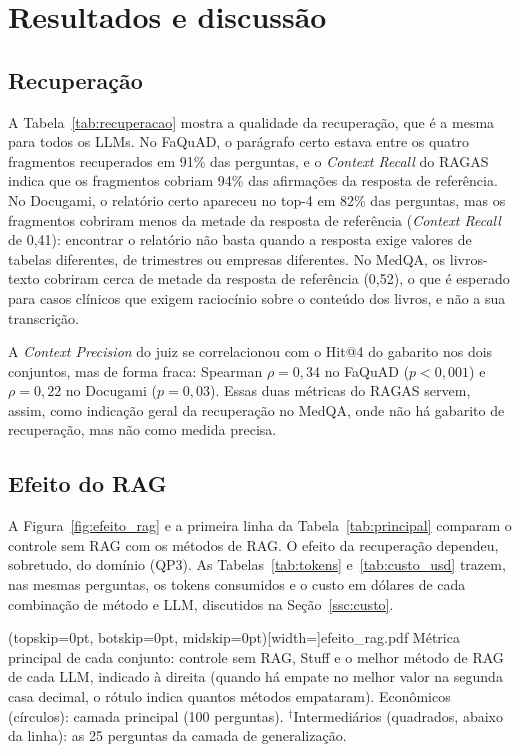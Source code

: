 \section{Resultados e discussão}
\label{sc:resultados}

\subsection{Recuperação}
\label{ssc:recuperacao}

A Tabela~\ref{tab:recuperacao} mostra a qualidade da recuperação, que é a mesma para todos os LLMs. No FaQuAD, o parágrafo certo estava entre os quatro fragmentos recuperados em 91\% das perguntas, e o \emph{Context Recall} do RAGAS indica que os fragmentos cobriam 94\% das afirmações da resposta de referência. No Docugami, o relatório certo apareceu no top-4 em 82\% das perguntas, mas os fragmentos cobriram menos da metade da resposta de referência (\emph{Context Recall} de 0,41): encontrar o relatório não basta quando a resposta exige valores de tabelas diferentes, de trimestres ou empresas diferentes. No MedQA, os livros-texto cobriram cerca de metade da resposta de referência (0,52), o que é esperado para casos clínicos que exigem raciocínio sobre o conteúdo dos livros, e não a sua transcrição.


A \emph{Context Precision} do juiz se correlacionou com o Hit@4 do gabarito nos dois conjuntos, mas de forma fraca: Spearman $\rho = 0{,}34$ no FaQuAD ($p < 0{,}001$) e $\rho = 0{,}22$ no Docugami ($p = 0{,}03$). Essas duas métricas do RAGAS servem, assim, como indicação geral da recuperação no MedQA, onde não há gabarito de recuperação, mas não como medida precisa.

\subsection{Efeito do RAG}
\label{ssc:efeito_rag}

A Figura~\ref{fig:efeito_rag} e a primeira linha da Tabela~\ref{tab:principal} comparam o controle sem RAG com os métodos de RAG. O efeito da recuperação dependeu, sobretudo, do domínio (QP3). As Tabelas~\ref{tab:tokens} e~\ref{tab:custo_usd} trazem, nas mesmas perguntas, os tokens consumidos e o custo em dólares de cada combinação de método e LLM, discutidos na Seção~\ref{ssc:custo}.

\Figure[!t](topskip=0pt, botskip=0pt, midskip=0pt)[width=\textwidth]{efeito_rag.pdf}
{Métrica principal de cada conjunto: controle sem RAG, Stuff e o melhor método de RAG de cada LLM, indicado à direita (quando há empate no melhor valor na segunda casa decimal, o rótulo indica quantos métodos empataram). Econômicos (círculos): camada principal (100 perguntas). $^\dagger$Intermediários (quadrados, abaixo da linha): as 25 perguntas da camada de generalização.\label{fig:efeito_rag}}

